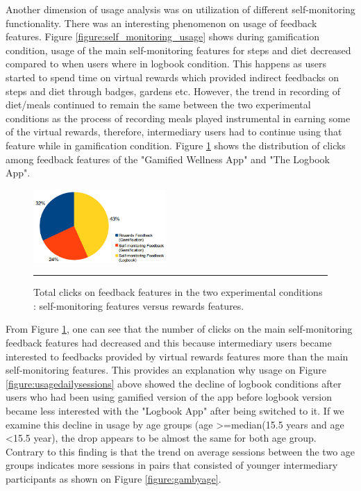 \documentclass{sig-alternate}
\begin{document}
Another dimension of usage analysis was on utilization of different self-monitoring functionality. There was an interesting phenomenon on usage of feedback features. Figure \ref{figure:self_monitoring_usage} shows during gamification condition, usage of the main self-monitoring features for steps and diet decreased compared to when users where in logbook condition. This happens as users started to spend time on virtual rewards which provided indirect feedbacks on steps and diet through badges, gardens etc. However, the trend in recording of diet/meals continued to remain the same between the two experimental conditions as the process of recording meals played instrumental in earning some of the virtual rewards, therefore, intermediary users had to continue using that feature while in gamification condition. Figure \ref{figure:clicks_distr} shows the distribution of clicks among feedback features of the "Gamified Wellness App" and "The Logbook App".\newline 
\begin{figure}[htbp]
  \centering
    \includegraphics[width=0.45\textwidth]{clicks_distr.png}
    \rule{26em}{0.5pt}
  \caption{Total clicks on feedback features in the two experimental conditions : self-monitoring features versus rewards features.}
  \label{figure:clicks_distr}
\end{figure}\newline
From Figure \ref{figure:clicks_distr}, one can see that the number of clicks on the main self-monitoring feedback features had decreased and this because intermediary users became interested to feedbacks provided by virtual rewards features more than the main self-monitoring features. This provides an explanation why usage on Figure \ref{figure:usagedailysessions} above showed the decline of logbook conditions  after users who had been using gamified version of the app before logbook version became less interested with the "Logbook App" after being switched to it. If we examine this decline in usage by age groups (age \textgreater=median(15.5 years and age \textless 15.5 year), the drop appears to be almost the same for both age group. Contrary to this finding is that the trend on average sessions between the two age groups indicates more sessions in pairs that consisted of younger intermediary participants as shown on Figure \ref{figure:gambyage}.\newline
\end{document}

